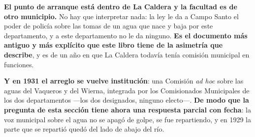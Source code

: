 \begin{cautela}
\begin{cautela}
\textbf{El punto de arranque está dentro de La Caldera y la facultad es de otro municipio.} No
hay que interpretar nada: la ley le da a Campo Santo el poder de policía sobre las tomas de un
agua que nace y baja por este departamento, y a este departamento no le da ninguno. \textbf{Es el
documento más antiguo y más explícito que este libro tiene de la asimetría que describe}, y es de
un año en que La Caldera todavía tenía comisión municipal en funciones.

\textbf{Y en 1931 el arreglo se vuelve institución}: una Comisión \textit{ad hoc} sobre las aguas
del Vaqueros y del Wierna, integrada por los Comisionados Municipales de los dos departamentos
---los dos designados, ninguno electo---. \textbf{De modo que la pregunta de esta sección tiene
ahora una respuesta parcial con fecha}: la voz municipal sobre el agua no se apagó de golpe, se
fue repartiendo, y en 1929 la parte que se repartió quedó del lado de abajo del río.
\end{cautela}


\end{cautela}

